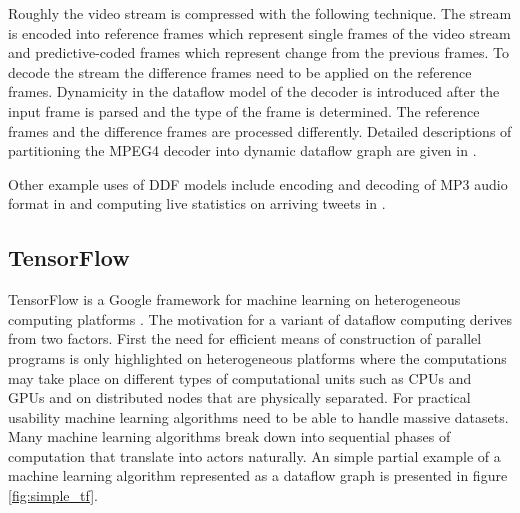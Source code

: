 \documentclass[conference,a4paper]{IEEEtran}
\begin{document}
Roughly the video stream is compressed with the following technique. The stream
is encoded into reference frames which represent single frames of the video
stream and predictive-coded frames which represent change from the previous
frames. To decode the stream the difference frames need to be applied on the
reference frames. Dynamicity in the dataflow model of the decoder is introduced
after the input frame is parsed and the type of the frame is determined. The
reference frames and the difference frames are processed differently. Detailed
descriptions of partitioning the MPEG4 decoder into dynamic dataflow graph are
given in \cite{eker2003cal, roquier2008automatic}.

Other example uses of DDF models include encoding and decoding of MP3 audio
format in \cite{bhattacharyya2013handbook} and computing live statistics on
arriving tweets in \cite{murray2013naiad}.

\subsection{TensorFlow}
TensorFlow is a Google framework for machine learning on heterogeneous computing
platforms \cite{tensorflow2015-whitepaper}. The motivation for a variant of
dataflow computing derives from two factors. First the need for efficient means
of construction of parallel programs is only highlighted on heterogeneous
platforms where the computations may take place on different types of
computational units such as CPUs and GPUs and on distributed nodes that are
physically separated.  For practical usability machine learning algorithms need
to be able to handle massive datasets. Many machine learning algorithms break
down into sequential phases of computation that translate into actors naturally.
An simple partial example of a machine learning algorithm represented as a
dataflow graph is presented in figure \ref{fig:simple_tf}.
\end{document}
